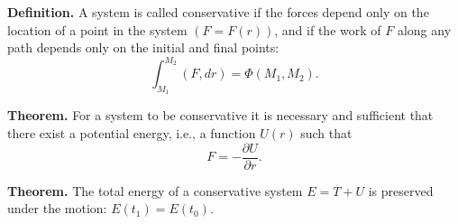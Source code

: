 \textbf{Definition.} A system is called conservative if the forces depend only on the location of a point in the system $(F = F(r))$, and if the work of $F$ along any path depends only on the initial and final points:
$$\int_{M_1}^{M_2} (F, dr) = \Phi(M_1, M_2).$$

\textbf{Theorem.} For a system to be conservative it is necessary and sufficient that there exist a potential energy, i.e., a function $U(r)$ such that
$$F = -\frac{\partial U}{\partial r}.$$

\textbf{Theorem.} The total energy of a conservative system $E = T + U$ is preserved under the motion: $E(t_1) = E(t_0)$.
